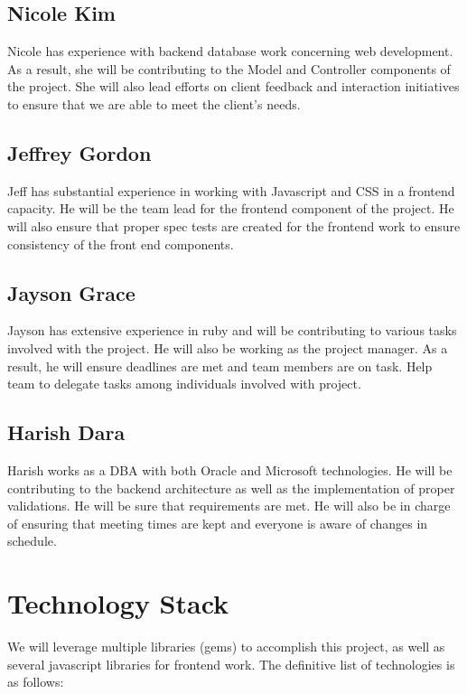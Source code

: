 \documentclass[12pt, a4paper, oneside]{article}
\begin{document}
\subsection*{Nicole Kim}
Nicole has experience with backend database work concerning web development. As a result, she will be contributing to the Model and Controller components of the project. She will also lead efforts on client feedback and interaction initiatives to ensure that we are able to meet the client's needs.

\subsection*{Jeffrey Gordon}
Jeff has substantial experience in working with Javascript and CSS in a frontend capacity. He will be the team lead for the frontend component of the project. He will also ensure that proper spec tests are created for the frontend work to ensure consistency of the front end components.

\subsection*{Jayson Grace}
Jayson has extensive experience in ruby and will be contributing to various tasks involved with the project. He will also be working as the project manager. As a result, he will ensure deadlines are met and team members are on task. Help team to delegate tasks among individuals involved with project. 

\subsection*{Harish Dara}
Harish works as a DBA with both Oracle and Microsoft technologies. He will be contributing to the backend architecture as well as the implementation of proper validations. He will be sure that requirements are met. He will also be in charge of ensuring that meeting times are kept and everyone is aware of changes in schedule.   

\section*{Technology Stack}
We will leverage multiple libraries (gems) to accomplish this project, as well as several javascript libraries for frontend work. The definitive list of technologies is as follows: \\
\end{document}
